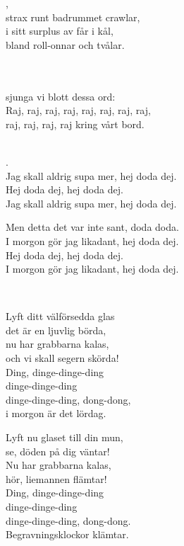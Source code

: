 {{,\\
strax runt badrummet crawlar,\\
i sitt surplus av får i kål,\\
bland roll-onnar och tvålar. \\

 \\       

\\
sjunga vi blott dessa ord:\\
Raj, raj, raj, raj, raj, raj, raj, raj,\\
raj, raj, raj, raj kring vårt bord.\\

 \\       

.\\
Jag skall aldrig supa mer, hej doda dej.\\
Hej doda dej, hej doda dej.\\
Jag skall aldrig supa mer, hej doda dej.

Men detta det var inte sant, doda doda.\\
I morgon gör jag likadant, hej doda dej.\\
Hej doda dej, hej doda dej.\\
I morgon gör jag likadant, hej doda dej. \\

\newpage

 \\       

\songtext{}
Lyft ditt välförsedda glas\\
det är en ljuvlig börda,\\
nu har grabbarna kalas,\\
och vi skall segern skörda!\\
Ding, dinge-dinge-ding\\
dinge-dinge-ding\\
dinge-dinge-ding, dong-dong,\\
i morgon är det lördag.

Lyft nu glaset till din mun,\\
se, döden på dig väntar!\\
Nu har grabbarna kalas,\\
hör, liemannen flämtar!\\
Ding, dinge-dinge-ding\\
dinge-dinge-ding\\
dinge-dinge-ding, dong-dong.\\
Begravningsklockor klämtar.

}}
